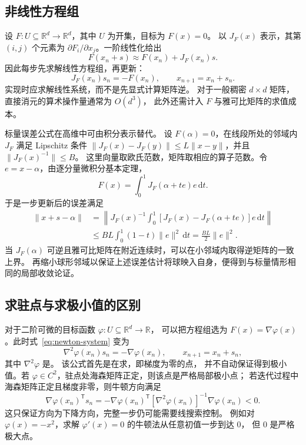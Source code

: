 \documentclass{ctexart}
\begin{document}
\subsection{非线性方程组}

设 $F:U\subseteq\mathbb R^d\to\mathbb R^d$，其中 $U$ 为开集，目标为 $F(x)=0$。
以 $J_F(x)$ 表示，其第 $(i,j)$ 个元素为
$\partial F_i/\partial x_j$。一阶线性化给出
\[
  F(x_n+s)\approx F(x_n)+J_F(x_n)s.
\]
因此每步先求解线性方程组，再更新：
\begin{equation}\label{eq:newton-system}
  J_F(x_n)s_n=-F(x_n),\qquad x_{n+1}=x_n+s_n.
\end{equation}
实现时应求解线性系统，而不是先显式计算矩阵逆。
对于一般稠密 $d\times d$ 矩阵，直接消元的算术操作量通常为 $O(d^3)$，
此外还需计入 $F$ 与雅可比矩阵的求值成本。

标量误差公式在高维中可由积分表示替代。
设 $F(\alpha)=0$，在线段所处的邻域内 $J_F$ 满足 Lipschitz 条件
$\|J_F(x)-J_F(y)\|\le L\|x-y\|$，并且 $\|J_F(x)^{-1}\|\le B$。
这里向量取欧氏范数，矩阵取相应的算子范数。令 $e=x-\alpha$，由逐分量微积分基本定理，
\[
  F(x)=\int_0^1J_F(\alpha+te)e\,\mathrm dt.
\]
于是一步更新后的误差满足
\begin{align*}
  \|x+s-\alpha\|
  &=\left\|J_F(x)^{-1}\int_0^1
      [J_F(x)-J_F(\alpha+te)]e\,\mathrm dt\right\|\\
  &\le BL\int_0^1(1-t)\|e\|^2\,\mathrm dt
   =\frac{BL}{2}\|e\|^2.
\end{align*}
当 $J_F(\alpha)$ 可逆且雅可比矩阵在附近连续时，可以在小邻域内取得逆矩阵的一致上界。
再缩小球形邻域以保证上述误差估计将球映入自身，便得到与标量情形相同的局部收敛论证。

\subsection{求驻点与求极小值的区别}

对于二阶可微的目标函数 $\varphi:U\subseteq\mathbb R^d\to\mathbb R$，
可以把方程组选为 $F(x)=\nabla\varphi(x)$。此时式~\eqref{eq:newton-system} 变为
\[
  \nabla^2\varphi(x_n)s_n=-\nabla\varphi(x_n),\qquad x_{n+1}=x_n+s_n,
\]
其中 $\nabla^2\varphi$ 是。
该公式首先是在求，即梯度为零的点，
并不自动保证得到极小值。若 $\varphi\in C^2$，驻点处海森矩阵正定，则该点是严格局部极小点；
若迭代过程中海森矩阵正定且梯度非零，则牛顿方向满足
\[
  \nabla\varphi(x_n)^{\mathsf T}s_n
   =-\nabla\varphi(x_n)^{\mathsf T}
      [\nabla^2\varphi(x_n)]^{-1}\nabla\varphi(x_n)<0.
\]
这只保证方向为下降方向，完整一步仍可能需要线搜索控制。
例如对 $\varphi(x)=-x^2$，求解 $\varphi'(x)=0$ 的牛顿法从任意初值一步到达 $0$，
但 $0$ 是严格极大点。
\end{document}
